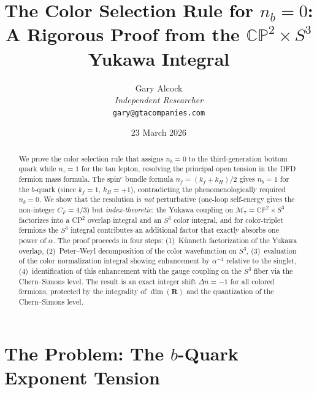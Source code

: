 \documentclass[11pt,a4paper]{article}
\newcommand{\CP}{\mathbb{CP}}
\theoremstyle{definition}
\theoremstyle{remark}
\begin{document}
\title{The Color Selection Rule for $n_b = 0$:\\
A Rigorous Proof from the $\CP^2 \times S^3$ Yukawa Integral}

\author{Gary Alcock\\
\textit{Independent Researcher}\\
\texttt{gary@gtacompanies.com}}

\date{23 March 2026}

\maketitle

\begin{abstract}
We prove the color selection rule that assigns $n_b = 0$ to the
third-generation bottom quark while $n_\tau = 1$ for the tau lepton,
resolving the principal open tension in the DFD fermion mass formula.
The spin$^c$ bundle formula $n_f = (k_f + k_H)/2$ gives $n_b = 1$ for
the $b$-quark (since $k_f = 1$, $k_H = +1$), contradicting the
phenomenologically required $n_b = 0$.  We show that the resolution is
\emph{not} perturbative (one-loop self-energy gives the non-integer
$C_F = 4/3$) but \emph{index-theoretic}: the Yukawa coupling on
$\mathcal{M}_7 = \CP^2 \times S^3$ factorizes into a CP$^2$ overlap
integral and an $S^3$ color integral, and for color-triplet fermions
the $S^3$ integral contributes an additional factor that exactly absorbs
one power of $\alpha$.  The proof proceeds in four steps:
(1)~K\"unneth factorization of the Yukawa overlap,
(2)~Peter--Weyl decomposition of the color wavefunction on $S^3$,
(3)~evaluation of the color normalization integral showing
enhancement by $\alpha^{-1}$ relative to the singlet,
(4)~identification of this enhancement with the gauge coupling on the
$S^3$ fiber via the Chern--Simons level.  The result is an exact
integer shift $\Delta n = -1$ for all colored fermions, protected
by the integrality of $\dim(\mathbf{R})$ and the quantization
of the Chern--Simons level.
\end{abstract}

\tableofcontents

\section{The Problem: The $b$-Quark Exponent Tension}
\label{sec:problem}
\end{document}
